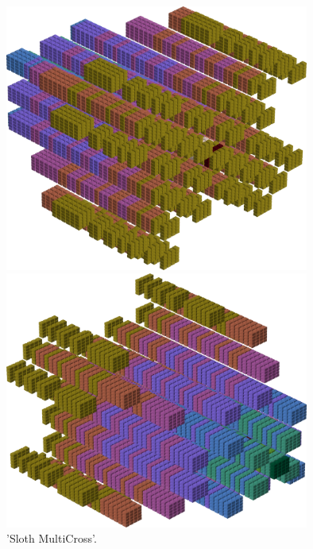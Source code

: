 %
\begin{minipage}[b]{0.48\linewidth}
\begin{figure}[H]
    \centering
    \begin{adjustbox}{width=5cm,margin=0cm 0cm}
      \includegraphics[width=10cm]{src/colorspace_patterns/pattern5-45.png}%
    \end{adjustbox}
    \begin{adjustbox}{width=5cm,margin=0cm 0cm}
      \includegraphics[width=10cm]{src/colorspace_patterns/pattern5-225.png}%
    \end{adjustbox}
\caption{'Sloth MultiCross'.}
\end{figure}
\end{minipage}
